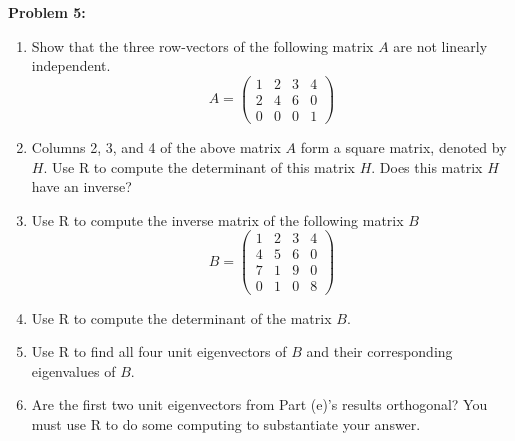 \documentclass[12pt]{article}
\newenvironment{problem}[1]{
    \textbf{Problem #1:}
}{
    \rmfamily \vspace{2em}
}
\begin{document}
\begin{problem}{5}
    \begin{enumerate}[label=\alph*)]
        \item Show that the three row-vectors of the following matrix \(A\) are not linearly independent.
            \[
                A = \begin{pmatrix}
                1 & 2 & 3 & 4 \\
                2 & 4 & 6 & 0 \\
                0 & 0 & 0 & 1
                \end{pmatrix}
            \]
        \item Columns 2, 3, and 4 of the above matrix \(A\) form a square matrix, denoted by \(H\). Use
        R to compute the determinant of this matrix \(H\). Does this matrix \(H\) have an inverse?
        \item Use R to compute the inverse matrix of the following matrix \(B\)
            \[
                B = \begin{pmatrix}
                1 & 2 & 3 & 4 \\
                4 & 5 & 6 & 0 \\
                7 & 1 & 9 & 0 \\
                0 & 1 & 0 & 8
                \end{pmatrix}
            \]
        \item Use R to compute the determinant of the matrix \(B\).
        \item Use R to find all four unit eigenvectors of \(B\) and their corresponding eigenvalues of \(B\).
        \item Are the first two unit eigenvectors from Part (e)’s results orthogonal? You must use R
        to do some computing to substantiate your answer.
    \end{enumerate}
\end{problem}
\end{document}
